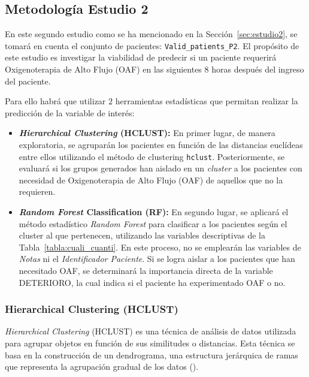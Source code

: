 \subsection{Metodología Estudio 2}\label{sec:metodologia-estudio-2}

En este segundo estudio como se ha mencionado en la Sección~\ref{sec:estudio2}, se tomará en cuenta el conjunto de pacientes: \texttt{Valid\_patients\_P2}. El propósito de este estudio es investigar la viabilidad de predecir si un paciente requerirá Oxigenoterapia de Alto Flujo (OAF) en las siguientes $8$ horas después del ingreso del paciente.

Para ello habrá que utilizar $2$ herramientas estadísticas que permitan realizar la predicción de la variable de interés:

\begin{itemize}
    \item \textbf{\textit{Hierarchical Clustering} (HCLUST):} En primer lugar, de manera exploratoria, se agruparán los pacientes en función de las distancias euclídeas entre ellos utilizando el método de clustering \texttt{hclust}. Posteriormente, se evaluará si los grupos generados han aislado en un \textit{cluster} a los pacientes con necesidad de Oxigenoterapia de Alto Flujo (OAF) de aquellos que no la requieren.
    \item \textbf{\textit{Random Forest} Classification (RF):} En segundo lugar, se aplicará el método estadístico \textit{Random Forest} para clasificar a los pacientes según el cluster al que pertenecen, utilizando las variables descriptivas de la Tabla~\ref{tabla:cuali_cuanti}. En este proceso, no se emplearán las variables de \textit{Notas} ni el \textit{Identificador Paciente}. Si se logra aislar a los pacientes que han necesitado OAF, se determinará la importancia directa de la variable DETERIORO, la cual indica si el paciente ha experimentado OAF o no.
\end{itemize}

\subsubsection{Hierarchical Clustering (HCLUST)}\label{sec:hclust}

\textit{Hierarchical Clustering} (HCLUST) es una técnica de análisis de datos utilizada para agrupar objetos en función de sus similitudes o distancias. Esta técnica se basa en la construcción de un dendrograma, una estructura jerárquica de ramas que representa la agrupación gradual de los datos (\cite{jain1988algorithms}).

